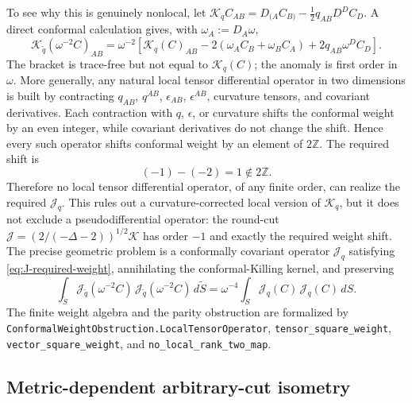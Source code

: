 \documentclass[11pt,a4paper]{article}
\begin{document}
To see why this is genuinely nonlocal, let \(\mathcal K_qC_{AB}=D_{(A}C_{B)}-\tfrac12q_{AB}D^DC_D\).  A direct conformal calculation gives, with \(\omega_A:=D_A\omega\),
\begin{equation}\label{eq:K-noncovariance}
  \mathcal K_{\tilde q}(\omega^{-2}C)_{AB}
  =
  \omega^{-2}\left[
    \mathcal K_q(C)_{AB}
    -2(\omega_AC_B+\omega_BC_A)
    +2q_{AB}\omega^DC_D
    \right].
\end{equation}
The bracket is trace-free but not equal to \(\mathcal K_q(C)\); the anomaly is first order in \(\omega\).  More generally, any natural local tensor differential operator in two dimensions is built by contracting \(q_{AB}\), \(q^{AB}\), \(\epsilon_{AB}\), \(\epsilon^{AB}\), curvature tensors, and covariant derivatives.  Each contraction with \(q\), \(\epsilon\), or curvature shifts the conformal weight by an even integer, while covariant derivatives do not change the shift.  Hence every such operator shifts conformal weight by an element of \(2\mathbb Z\).  The required shift is
\begin{equation}
  (-1)-(-2)=1\notin2\mathbb Z .
\end{equation}
Therefore no local tensor differential operator, of any finite order, can realize the required \(\mathcal J_q\).  This rules out a curvature-corrected local version of \(\mathcal K_q\), but it does not exclude a pseudodifferential operator: the round-cut \(\mathcal J=(2/(-\Delta-2))^{1/2}\mathcal K\) has order \(-1\) and exactly the required weight shift.  The precise geometric problem is a conformally covariant operator \(\mathcal J_q\) satisfying \eqref{eq:J-required-weight}, annihilating the conformal-Killing kernel, and preserving
\begin{equation}\label{eq:J-covariant-isometry}
  \int_{\tilde S}\mathcal J_{\tilde q}(\omega^{-2}C)\,\mathcal J_{\tilde q}(\omega^{-2}C)\,d\tilde S
  =
  \omega^{-4}
  \int_S\mathcal J_q(C)\,\mathcal J_q(C)\,dS .
\end{equation}
The finite weight algebra and the parity obstruction are formalized by \texttt{ConformalWeightObstruction.LocalTensorOperator}, \texttt{tensor\_square\_weight}, \texttt{vector\_square\_weight}, and \texttt{no\_local\_rank\_two\_map}.

\subsection{Metric-dependent arbitrary-cut isometry}
\end{document}
